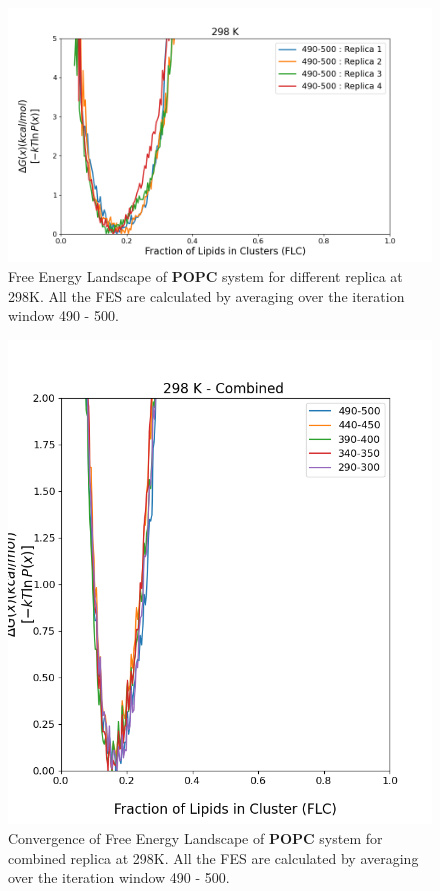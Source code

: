 \documentclass{biophys-new}
\begin{document}



\begin{figure}[hbt!]
\centering
\includegraphics[width=1.1\linewidth]{all_plots/ClusterLipids2Total/DPPC_POPC_CHOL/298K/Average_POPC_298_ClusterLipids2Total.png}
\caption{Free Energy Landscape of \textbf{POPC} system for different replica at 298K. All the FES are calculated by averaging over the iteration window 490 - 500.}
\label{fig:view}

\end{figure}

\begin{figure}[hbt!]
\centering
\includegraphics[width=0.6\linewidth]{all_plots/ClusterLipids2Total/DPPC_POPC_CHOL/298K/Convergence_POPC_MULTI__298_ClusterLipids2Total.png}
\caption{Convergence of Free Energy Landscape of \textbf{POPC} system for combined replica at 298K. All the FES are calculated by averaging over the iteration window 490 - 500.}
\label{fig:view}

\end{figure}
\end{document}
